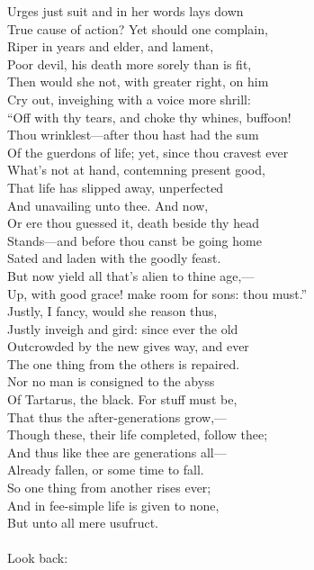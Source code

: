 Urges just suit and in her words lays down\\
True cause of action? Yet should one complain,\\
Riper in years and elder, and lament,\\
Poor devil, his death more sorely than is fit,\\
Then would she not, with greater right, on him\\
Cry out, inveighing with a voice more shrill:\\
``Off with thy tears, and choke thy whines, buffoon!\\
Thou wrinklest—after thou hast had the sum\\
Of the guerdons of life; yet, since thou cravest ever\\
What's not at hand, contemning present good,\\
That life has slipped away, unperfected\\
And unavailing unto thee. And now,\\
Or ere thou guessed it, death beside thy head\\
Stands—and before thou canst be going home\\
Sated and laden with the goodly feast.\\
But now yield all that's alien to thine age,—\\
Up, with good grace! make room for sons: thou must.''\\
Justly, I fancy, would she reason thus,\\
Justly inveigh and gird: since ever the old\\
Outcrowded by the new gives way, and ever\\
The one thing from the others is repaired.\\
Nor no man is consigned to the abyss\\
Of Tartarus, the black. For stuff must be,\\
That thus the after-generations grow,—\\
Though these, their life completed, follow thee;\\
And thus like thee are generations all—\\
Already fallen, or some time to fall.\\
So one thing from another rises ever;\\
And in fee-simple life is given to none,\\
But unto all mere usufruct.\\
\\
Look back:\\
